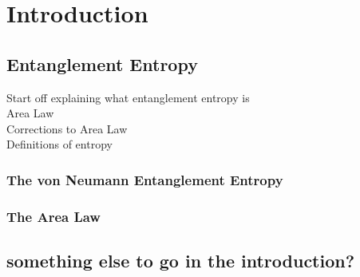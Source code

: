 \chapter{Introduction}
\section{Entanglement Entropy}



Start off explaining what entanglement entropy is\\
Area Law\\
Corrections to Area Law\\
Definitions of entropy\\


\subsection{The von Neumann Entanglement Entropy}
\subsection{The Area Law}
\section{something else to go in the introduction?}
